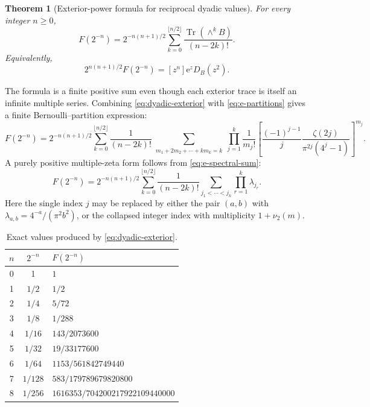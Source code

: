 \documentclass[11pt,oneside]{article}
\newtheorem{theorem}{Theorem}[section]
\theoremstyle{definition}
\newcommand{\e}{\mathrm e}
\newcommand{\Tr}{\operatorname{Tr}}
\newcommand{\vtwo}{\nu_2}
\begin{document}
\begin{theorem}[Exterior-power formula for reciprocal dyadic values]
\label{thm:dyadic-exterior}
For every integer \(n\ge0\),
\begin{equation}
 \boxed{\quad
 F(2^{-n})=2^{-n(n+1)/2}
 \sum_{k=0}^{\lfloor n/2\rfloor}
 \frac{\Tr(\wedge^kB)}{(n-2k)!}.
 \quad}
 \label{eq:dyadic-exterior}
\end{equation}
Equivalently,
\begin{equation}
 2^{n(n+1)/2}F(2^{-n})
 =[z^n]\e^zD_B(z^2).
 \label{eq:dyadic-coefficient-det}
\end{equation}
\end{theorem}

The formula is a finite positive sum even though each exterior trace is itself an
infinite multiple series.  Combining \eqref{eq:dyadic-exterior} with
\eqref{eq:e-partitions} gives a finite Bernoulli--partition expression:
\begin{equation}
 F(2^{-n})=2^{-n(n+1)/2}
 \sum_{k=0}^{\lfloor n/2\rfloor}\frac1{(n-2k)!}
 \sum_{\substack{m_1+2m_2+\cdots+km_k=k}}
 \prod_{j=1}^{k}
 \frac1{m_j!}
 \left[\frac{(-1)^{j-1}}j
 \frac{\zeta(2j)}{\pi^{2j}(4^j-1)}\right]^{m_j}.
 \label{eq:dyadic-Bernoulli-partition}
\end{equation}
A purely positive multiple-zeta form follows from \eqref{eq:e-spectral-sum}:
\begin{equation}
 F(2^{-n})=2^{-n(n+1)/2}
 \sum_{k=0}^{\lfloor n/2\rfloor}\frac1{(n-2k)!}
 \sum_{j_1<\cdots<j_k}\prod_{r=1}^{k}\lambda_{j_r}.
 \label{eq:dyadic-positive-multiple}
\end{equation}
Here the single index \(j\) may be replaced by either the pair \((a,b)\) with
\(\lambda_{a,b}=4^{-a}/(\pi^2b^2)\), or the collapsed integer index with
multiplicity \(1+\vtwo(m)\).

\begin{table}[H]
\centering
\caption{Exact values produced by \eqref{eq:dyadic-exterior}.}
\label{tab:dyadic-values}
\begin{tabular}{ccl}
\toprule
\(n\)&\(2^{-n}\)&\(F(2^{-n})\)\\
\midrule
0&1&\(1\)\\
1&\(1/2\)&\(1/2\)\\
2&\(1/4\)&\(5/72\)\\
3&\(1/8\)&\(1/288\)\\
4&\(1/16\)&\(143/2073600\)\\
5&\(1/32\)&\(19/33177600\)\\
6&\(1/64\)&\(1153/561842749440\)\\
7&\(1/128\)&\(583/179789679820800\)\\
8&\(1/256\)&\(1616353/704200217922109440000\)\\
\bottomrule
\end{tabular}
\end{table}
\end{document}
